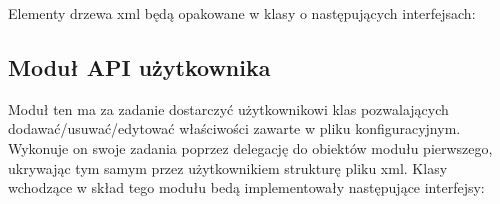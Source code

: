 \documentclass{article}
\begin{document}
Elementy drzewa xml będą opakowane w klasy o następujących interfejsach:



\subsection{Moduł API użytkownika}
Moduł ten ma za zadanie dostarczyć użytkownikowi klas pozwalających dodawać/usuwać/edytować
właściwości zawarte w pliku konfiguracyjnym.
Wykonuje on swoje zadania poprzez delegację do obiektów modułu pierwszego,
ukrywając tym samym przez użytkownikiem strukturę pliku xml.
Klasy wchodzące w skład tego modułu bedą implementowały następujące interfejsy:

\newpage


\end{document}
